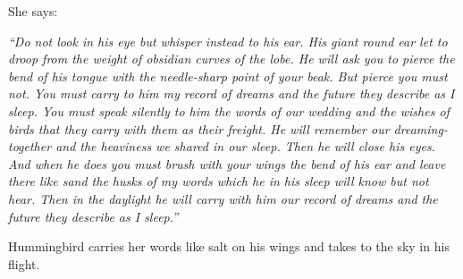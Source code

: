She says:

\textit{``Do not look in his eye but whisper instead to his ear. His giant
round ear let to droop from the weight of obsidian curves of the lobe. He will
ask you to pierce the bend of his tongue with the needle-sharp point of
your beak. But pierce you must not. You must carry to him my record of dreams
and the future they describe as I sleep. You must speak silently to him the
words of our wedding and the wishes of birds that they carry with them as their
freight. He will remember our dreaming-together and the heaviness we shared in
our sleep. Then he will close his eyes. And when he does you must brush with
your wings the bend of his ear and leave there like sand the husks of my words
which he in his sleep will know but not hear. Then in the daylight he will
carry with him our record of dreams and the future they describe as I sleep.''}

Hummingbird carries her words like salt on his wings and takes to the sky in
his flight.
